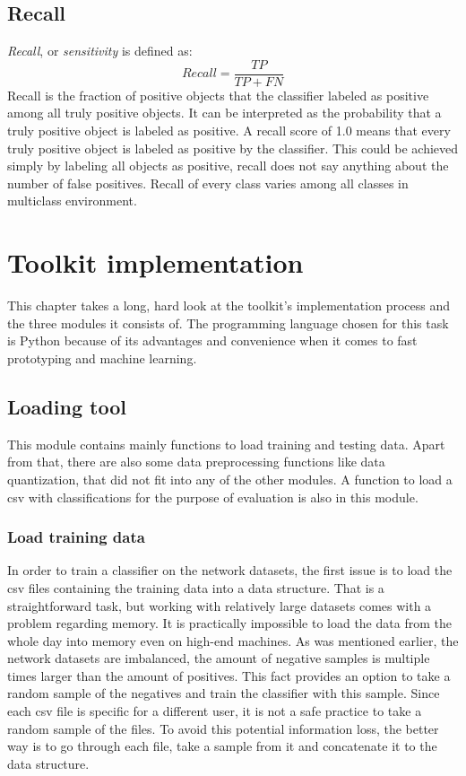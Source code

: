 \documentclass{article}
\begin{document}
    \subsection{Recall}
      {\it Recall}, or {\it sensitivity} is defined as:
      \begin{displaymath}
        Recall = \frac{TP}{TP + FN}
      \end{displaymath}
      Recall is the fraction of positive objects that the classifier labeled as positive among all truly positive objects. It can be interpreted as the probability that a truly positive object is labeled as positive. A recall score of 1.0 means that every truly positive object is labeled as positive by the classifier. This could be achieved simply by labeling all objects as positive, recall does not say anything about the number of false positives. Recall of every class varies among all classes in multiclass environment.
  \newpage
  \section{Toolkit implementation}
      This chapter takes a long, hard look at the toolkit's implementation process and the three modules it consists of. The programming language chosen for this task is Python because of its advantages and convenience when it comes to fast prototyping and machine learning.
    \subsection{Loading tool}
      This module contains mainly functions to load training and testing data. Apart from that, there are also some data preprocessing functions like data quantization, that did not fit into any of the other modules. A function to load a csv with classifications for the purpose of evaluation is also in this module.
      \subsubsection{Load training data}
        In order to train a classifier on the network datasets, the first issue is to load the csv files containing the training data into a data structure. That is a straightforward task, but working with relatively large datasets comes with a problem regarding memory. It is practically impossible to load the data from the whole day into memory even on high-end machines. As was mentioned earlier, the network datasets are imbalanced, the amount of negative samples is multiple times larger than the amount of positives. This fact provides an option to take a random sample of the negatives and train the classifier with this sample. Since each csv file is specific for a different user, it is not a safe practice to take a random sample of the files. To avoid this potential information loss, the better way is to go through each file, take a sample from it and concatenate it to the data structure.
\end{document}

